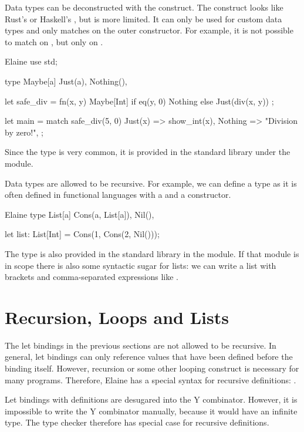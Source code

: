 Data types can be deconstructed with the  construct. The  construct looks like Rust's  or Haskell's , but is more limited. It can only be used for custom data types and only matches on the outer constructor. For example, it is not possible to match on , but only on .

\begin{lst}{Elaine}
use std;

type Maybe[a] {
    Just(a),
    Nothing(),
}

let safe_div = fn(x, y) Maybe[Int] {
    if eq(y, 0) {
        Nothing
    } else {
        Just(div(x, y))
    }
};

let main = match safe_div(5, 0) {
    Just(x) => show_int(x),
    Nothing => "Division by zero!",
};
\end{lst}

Since the  type is very common, it is provided in the standard library under the  module.

Data types are allowed to be recursive. For example, we can define a  type as it is often defined in functional languages with a  and a  constructor.

\begin{lst}{Elaine}
type List[a] {
    Cons(a, List[a]),
    Nil(),
}

let list: List[Int] = Cons(1, Cons(2, Nil()));
\end{lst}

The  type is also provided in the standard library in the  module. If that module is in scope there is also some syntactic sugar for lists: we can write a list with brackets and comma-separated expressions like \el{[1, 2, 3]}.

\section{Recursion, Loops and Lists}\label{sec:recursion}

The let bindings in the previous sections are not allowed to be recursive. In general, let bindings can only reference values that have been defined before the binding itself. However, recursion or some other looping construct is necessary for many programs. Therefore, Elaine has a special syntax for recursive definitions: .

Let bindings with  definitions are desugared into the Y combinator. However, it is impossible to write the Y combinator manually, because it would have an infinite type. The type checker therefore has special case for recursive definitions.

